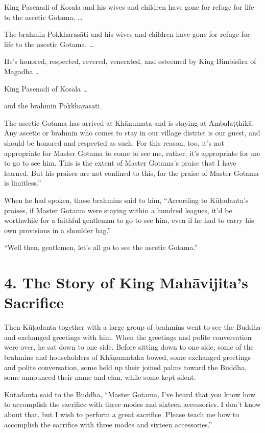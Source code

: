 \documentclass[12pt,openany]{book}%
\begin{document}
King Pasenadi of Kosala and his wives and children have gone for refuge for life to the ascetic Gotama. … 

The brahmin \textsanskrit{Pokkharasāti} and his wives and children have gone for refuge for life to the ascetic Gotama. … 

He’s honored, respected, revered, venerated, and esteemed by King \textsanskrit{Bimbisāra} of Magadha … 

King Pasenadi of Kosala … 

and the brahmin \textsanskrit{Pokkharasāti}. 

The ascetic Gotama has arrived at \textsanskrit{Khāṇumata} and is staying at \textsanskrit{Ambalaṭṭhikā}. Any ascetic or brahmin who comes to stay in our village district is our guest, and should be honored and respected as such. For this reason, too, it’s not appropriate for Master Gotama to come to see me, rather, it’s appropriate for me to go to see him. This is the extent of Master Gotama’s praise that I have learned. But his praises are not confined to this, for the praise of Master Gotama is limitless.” 

When he had spoken, those brahmins said to him, “According to \textsanskrit{Kūṭadanta}’s praises, if Master Gotama were staying within a hundred leagues, it’d be worthwhile for a faithful gentleman to go to see him, even if he had to carry his own provisions in a shoulder bag.” 

“Well then, gentlemen, let’s all go to see the ascetic Gotama.” 

\section*{4. The Story of King \textsanskrit{Mahāvijita}’s Sacrifice }

Then \textsanskrit{Kūṭadanta} together with a large group of brahmins went to see the Buddha and exchanged greetings with him. When the greetings and polite conversation were over, he sat down to one side. Before sitting down to one side, some of the brahmins and householders of \textsanskrit{Khāṇumataka} bowed, some exchanged greetings and polite conversation, some held up their joined palms toward the Buddha, some announced their name and clan, while some kept silent. 

\textsanskrit{Kūṭadanta} said to the Buddha, “Master Gotama, I’ve heard that you know how to accomplish the sacrifice with three modes and sixteen accessories. I don’t know about that, but I wish to perform a great sacrifice. Please teach me how to accomplish the sacrifice with three modes and sixteen accessories.” 
\end{document}
